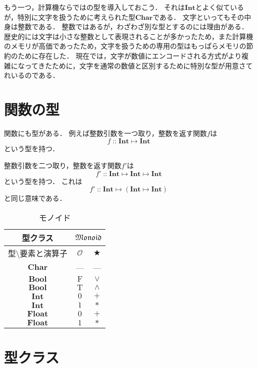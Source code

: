 \documentclass[twocolumn]{jsbook}
\newcommand{\typeclassname}[1]{\mathfrak{#1}}
\newcommand{\typeclassmonoid}{\typeclassname{Monoid}}
\newcommand{\typename}[1]{\mathbf{#1}}
\newcommand{\typebool}{\typename{Bool}}
\newcommand{\typechar}{\typename{Char}}
\newcommand{\typeint}{\typename{Int}}
\newcommand{\typefloat}{\typename{Float}}
\newcommand{\morph}[2]{#1\mapsto#2}
\newcommand{\mmorph}[3]{#1\mapsto#2\mapsto#3}
\newcommand{\mmorphwithparenthesis}[3]{#1\mapsto(#2\mapsto#3)}
\newcommand{\constantname}[1]{\mathrm{#1}}
\newcommand{\constanttrue}{\constantname{T}}
\newcommand{\constantfalse}{\constantname{F}}
\newcommand{\binaryadd}{+}
\newcommand{\binarymultiply}{*}
\newcommand{\binaryor}{\vee}
\newcommand{\binaryand}{\wedge}
\newcommand{\istypeof}{\mathop{::}}
\newcommand{\mathbinaryop}{\bigstar}
\newcommand{\mathidentity}{\mathcal{O}}
\begin{document}
もう一つ，計算機ならではの型を導入しておこう．
それは$\typeint$とよく似ているが，特別に文字を扱うために考えられた型$\typechar$である．
文字といってもその中身は整数である．
整数ではあるが，わざわざ別な型とするのには理由がある．
歴史的には文字は小さな整数として表現されることが多かったため，また計算機のメモリが高価であったため，文字を扱うための専用の型はもっぱらメモリの節約のために存在した．
現在では，文字が数値にエンコードされる方式がより複雑になってきたために，文字を通常の数値と区別するために特別な型が用意さてれいるのである．


\section{関数の型}

関数にも型がある．
例えば整数引数を一つ取り，整数を返す関数$f$は$$f\istypeof\morph{\typeint}{\typeint}$$という型を持つ．

整数引数を二つ取り，整数を返す関数$f'$は$$f'\istypeof\mmorph{\typeint}{\typeint}{\typeint}$$という型を持つ．
これは$$f'\istypeof\mmorphwithparenthesis{\typeint}{\typeint}{\typeint}$$と同じ意味である．

\begin{table}
\caption{モノイド}
\label{tab:monoids}
\begin{center}
\begin{tabular}{||c||c|c||}
\hline
型クラス
    &\multicolumn{2}{|c||}{$\typeclassmonoid$}\\
\hline\hline
型$\setminus$要素と演算子
    &$\mathidentity$
    &$\mathbinaryop$\\
\hline
$\typechar$
    &---
    &---\\
\hline
$\typebool$
    &$\constantfalse$
    &$\binaryor$\\
\hline
$\typebool$
    &$\constanttrue$
    &$\binaryand$\\
\hline
$\typeint$
    &$0$
    &$\binaryadd$\\
\hline
$\typeint$
    &$1$
    &$\binarymultiply$\\
\hline
$\typefloat$
    &$0$
    &$\binaryadd$\\
\hline
$\typefloat$
    &$1$
    &$\binarymultiply$\\
\hline
\end{tabular}
\end{center}
\end{table}

\section{型クラス}
\end{document}
